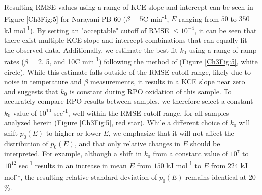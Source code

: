 Resulting RMSE values using a range of KCE slope and intercept can be seen in Figure \ref{Ch3Fig:5} for Narayani PB-60 ($\beta = 5$\textdegree C min\textsuperscript{-1}, $E$ ranging from $50$ to $350$ kJ mol\textsuperscript{-1}). By setting an "acceptable" cutoff of RMSE $\leq 10^{-4}$, it can be seen that there exist multiple KCE slope and intercept combinations that can equally fit the observed data. Additionally, we estimate the best-fit $k_{0}$ using a range of ramp rates ($\beta$ = 2, 5, and 10\textdegree C min\textsuperscript{-1}) following the method of \citet{Miura:1998jf} (Figure \ref{Ch3Fig:5}, white circle). While this estimate falls outside of the RMSE cutoff range, likely due to noise in temperature and $\beta$ measurements, it results in a KCE slope near zero and suggests that $k_{0}$ is constant during RPO oxidation of this sample. To accurately compare RPO results between samples, we therefore select a constant $k_{0}$ value of $10^{10}$ sec\textsuperscript{-1}, well within the RMSE cutoff range, for all samples analyzed herein (Figure \ref{Ch3Fig:5}, red star). While a different choice of $k_{0}$ will shift $p_{0}(E)$ to higher or lower $E$, we emphasize that it will not affect the distribution of $p_{0}(E)$, and that only relative changes in $E$ should be interpreted. For example, although a shift in $k_{0}$ from a constant value of $10^{7}$ to $10^{12}$ sec\textsuperscript{-1} results in an increase in mean $E$ from $150$ kJ mol\textsuperscript{-1} to $E$ from $224$ kJ mol\textsuperscript{-1}, the resulting relative standard deviation of $p_{0}(E)$ remains identical at $20$\%.
 
